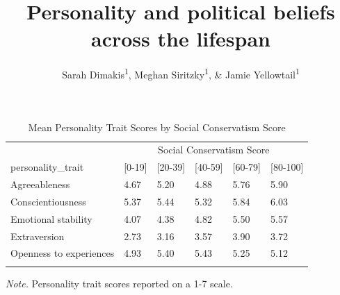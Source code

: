 \documentclass[man]{apa6}
\title{Personality and political beliefs across the lifespan}
\author{Sarah Dimakis\textsuperscript{1}, Meghan Siritzky\textsuperscript{1}, \&
Jamie Yellowtail\textsuperscript{1}}
\date{}
\affiliation{
\vspace{0.5cm}
\textsuperscript{1} University of Oregon}
\begin{document}
\maketitle

\begin{table}[tbp]
\begin{center}
\begin{threeparttable}
\caption{\label{tab:table1}Mean Personality Trait Scores by Social Conservatism Score}
\begin{tabular}{llllll}
\toprule
 & \multicolumn{5}{c}{Social Conservatism Score} \\
\cmidrule(r){2-6}
personality\_trait & \multicolumn{1}{c}{[0-19]} & \multicolumn{1}{c}{[20-39]} & \multicolumn{1}{c}{[40-59]} & \multicolumn{1}{c}{[60-79]} & \multicolumn{1}{c}{[80-100]}\\
\midrule
Agreeableness & 4.67 & 5.20 & 4.88 & 5.76 & 5.90\\
Conscientiousness & 5.37 & 5.44 & 5.32 & 5.84 & 6.03\\
Emotional stability & 4.07 & 4.38 & 4.82 & 5.50 & 5.57\\
Extraversion & 2.73 & 3.16 & 3.57 & 3.90 & 3.72\\
Openness to experiences & 4.93 & 5.40 & 5.43 & 5.25 & 5.12\\
\bottomrule
\addlinespace
\end{tabular}
\begin{tablenotes}[para]
\normalsize{\textit{Note.} Personality trait scores reported on a 1-7 scale.}
\end{tablenotes}
\end{threeparttable}
\end{center}
\end{table}
\end{document}

